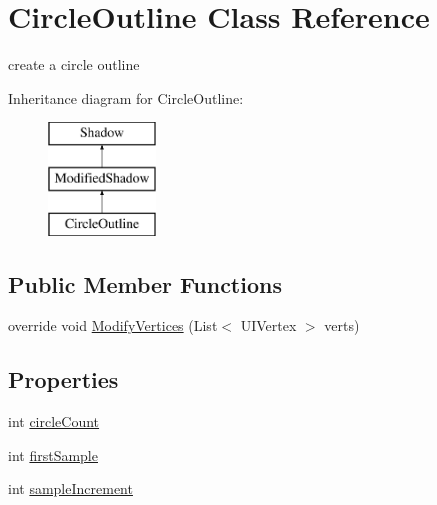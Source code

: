 \hypertarget{class_circle_outline}{}\section{Circle\+Outline Class Reference}
\label{class_circle_outline}


create a circle outline  


Inheritance diagram for Circle\+Outline\+:\begin{figure}[H]
\begin{center}
\leavevmode
\includegraphics[height=3.000000cm]{class_circle_outline}
\end{center}
\end{figure}
\subsection*{Public Member Functions}
\begin{DoxyCompactItemize}
\item 
override void \mbox{\hyperlink{class_circle_outline_a60ecaf1389896d2bca9b38c8767ca20a}{Modify\+Vertices}} (List$<$ U\+I\+Vertex $>$ verts)
\end{DoxyCompactItemize}
\subsection*{Properties}
\begin{DoxyCompactItemize}
\item 
int \mbox{\hyperlink{class_circle_outline_a9b716058213c2669cfadf143ce970c48}{circle\+Count}}
\item 
int \mbox{\hyperlink{class_circle_outline_aadda26b329945bc2a1fb1d96cf0e7515}{first\+Sample}}
\item 
int \mbox{\hyperlink{class_circle_outline_a3b50a97b874f55d06e09c2a96e3ca121}{sample\+Increment}}
\end{DoxyCompactItemize}
